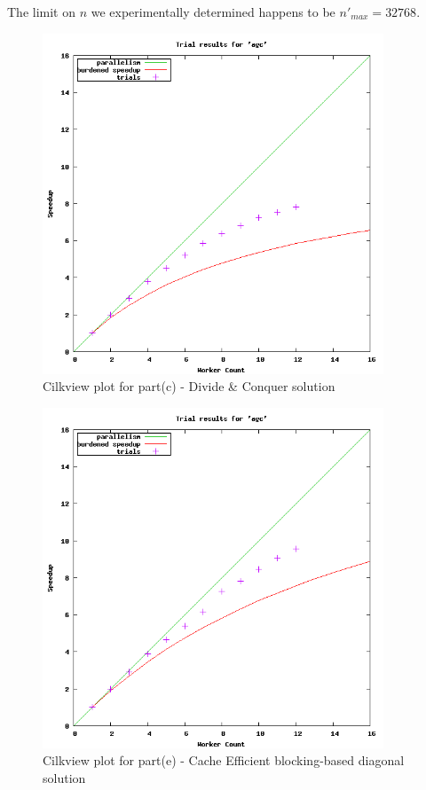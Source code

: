 \documentclass{article}
\begin{document}
The limit on $n$ we experimentally determined happens to be ${n'}_{max} = 32768$.

\begin{figure}[h!]
  \begin{center}
    \includegraphics[width=4in]{images/agc-partc.png}
    \caption{Cilkview plot for part(c) - Divide \& Conquer solution}
    \label{fig:cilkview_c}
  \end{center}
\end {figure}

\begin{figure}[h!]
  \begin{center}
    \includegraphics[width=4in]{images/agc-parte.png}
    \caption{Cilkview plot for part(e) - Cache Efficient blocking-based diagonal solution}
    \label{fig:cilkview_e}
  \end{center}
\end {figure}
\end{document}
